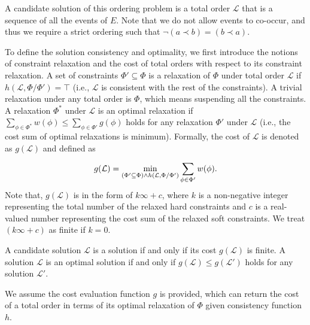 \documentclass[letterpaper]{article} %
\theoremstyle{definition}
\newcommand{\LE}{\mathcal{L}}
\begin{document}
 A candidate solution of this ordering problem is a total order $\LE$ that is a sequence of all the events of $E$. Note that we do not allow events to co-occur, and thus we require a strict ordering such that $\lnot (a \prec b) = (b \prec a)$. 

To define the solution consistency and optimality, we first introduce the notions of constraint relaxation and the cost of total orders with respect to its constraint relaxation. A set of constraints $\Phi' \subseteq \Phi$ is a relaxation of $\Phi$ under total order $\LE$ if $h(\LE, \Phi / \Phi') = \top$ (i.e., $\LE$ is consistent with the rest of the constraints). A trivial relaxation under any total order is $\Phi$, which means suspending all the constraints. A relaxation $\Phi^*$ under $\LE$ is an optimal relaxation if $\sum_{\phi \in \Phi^*} w(\phi) \leq \sum_{\phi \in \Phi'} g(\phi)$ holds for any relaxation $\Phi'$ under $\LE$ (i.e., the cost sum of optimal relaxations is minimum). Formally, the cost of $\LE$ is denoted as $g(\LE)$ and defined as 

$${\scriptsize
g(\LE) = \min_{(\Phi' \subseteq \Phi) \land h(\LE, \Phi / \Phi') } \sum_{\phi \in \Phi'} w(\phi)}.$$
Note that, $g(\LE)$ is in the form of $k\infty + c$, where $k$ is a non-negative integer representing the total number of the relaxed hard constraints and $c$ is a real-valued number representing the cost sum of the relaxed soft constraints. We treat $(k\infty+c)$ as finite if $k=0$.

A candidate solution $\LE$ is a solution if and only if its cost $g(\LE)$ is finite. A solution $\LE$ is an optimal solution if and only if $g(\LE) \leq g(\LE')$ holds for any solution $\mathcal{L'}$. 

We assume the cost evaluation function $g$ is provided, which can return the cost of a total order in terms of its optimal relaxation of $\Phi$ given consistency function $h$. 

\end{document}
